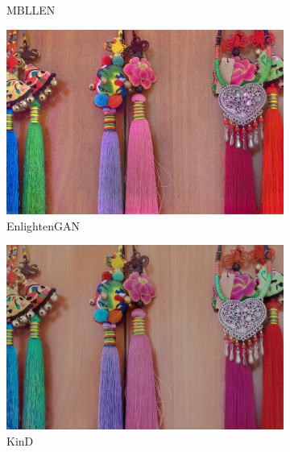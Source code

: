 \documentclass[a4paper]{ctexart}
\begin{document}
\begin{figure}[htb]
\begin{subfigure}{0.19\textwidth}
				\captionsetup{font=scriptsize}
				\caption{MBLLEN}
				\label{fig: MBLLEN1}
			\end{subfigure}
			\begin{subfigure}{0.19\textwidth}
				\includegraphics[width=\linewidth]{picture/LLIE/Experiment/EnlightenGAN1}
				\captionsetup{font=scriptsize}
				\caption{EnlightenGAN}
				\label{fig: EnlightenGAN1}
			\end{subfigure}
			\begin{subfigure}{0.19\textwidth}
				\includegraphics[width=\linewidth]{picture/LLIE/Experiment/KinD1}
				\captionsetup{font=scriptsize}
				\caption{KinD}
				\label{fig: KinD1}
			\end{subfigure}
			\\
			\begin{subfigure}{0.19\textwidth}

\end{subfigure}
\end{figure}
\end{document}
